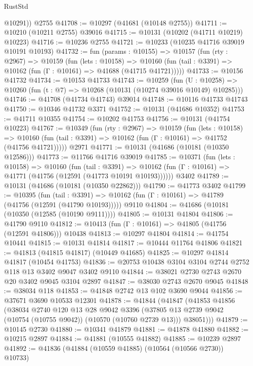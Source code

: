 \begin{lexlean}{RustStd}
\begin{coremodule}
        @10291))
    @2755
@41708 := @10297 (@41681 (@10148 @2755))
@41711 := @10210 (@10211 @2755) @39016
@41715 := @10131 (@10202 (@41711 @10219) @10223)
@41716 := @10236 @2755
@41721 := @10233 (@10235 @41716 @39019 @10191 @10193)
@41732 := fun (params : @10155) =>
  @10157
    (fun (rty : @2967) =>
    @10159
      (fun (lets : @10158) =>
      @10160 (fun (tail : @3391) => @10162 (fun (Γ : @10161) => @41688 (@41715 @41721)))))
@41733 := @10156 @41732
@41734 := @10153 @41733
@41743 := @10259
    (fun (U : @10258) => @10260 (fun (t : @7) => @10268 (@10131 (@10274 @39016 @10149) @10285)))
@41746 := @41708 (@41734 @41743) @39014
@41748 := @10116 @41733 @41743
@41750 := @10346 @41732 @3371
@41752 := @10131 (@41686 @10352)
@41753 := @41711 @10355
@41754 := @10202 @41753
@41756 := @10131 (@41754 @10223)
@41767 := @10349
    (fun (rty : @2967) =>
    @10159
      (fun (lets : @10158) =>
      @10160 (fun (tail : @3391) => @10162 (fun (Γ : @10161) => @41752 (@41756 @41721)))))
    @2971
@41771 := @10131 (@41686 (@10181 (@10350 @12586)))
@41773 := @11766 @41716 @39019
@41785 := @10371
    (fun (lets : @10158) =>
    @10160
      (fun (tail : @3391) =>
      @10162 (fun (Γ : @10161) => @41771 (@41756 (@12591 (@41773 @10191 @10193))))))
    @3402
@41789 := @10131 (@41686 (@10181 (@10350 @22862)))
@41790 := @41773 @3402
@41799 := @10395
    (fun (tail : @3391) => @10162 (fun (Γ : @10161) => @41789 (@41756 (@12591 (@41790 @10193)))))
    @9110
@41804 := @41686 (@10181 (@10350 (@12585 (@10190 @9111))))
@41805 := @10131 @41804
@41806 := @41790 @9110
@41812 := @10413 (fun (Γ : @10161) => @41805 (@41756 (@12591 @41806))) @10438
@41813 := @10297 @41804
@41814 := @41754 @10441
@41815 := @10131 @41814
@41817 := @10444 @11764 @41806
@41821 := @41813 (@41815 @41817) (@10449 @41685)
@41825 := @10297 @41814 @41817 (@10454 @41753)
@41836 := @20753 @10438 @3104 @3104 @2744 @2752 @118 @13 @3402 @9047 @3402 @9110
@41844 := @38021 @2730 @2743 @2670 @20 @3402 @9045 @3104 @2897
@41847 := @38030 @2743 @2670 @9045
@41848 := @38034 @118
@41853 := @41848 @2742 @13 @102 @3690 @9044
@41856 := @37671 @3690 @10533 @12301
@41878 := @41844
    (@41847
      (@41853
        @41856
        (@38034
          @2740
          @120
          @13
          @28
          @9042
          @3396
          (@37805 @13 @2739 @9042 (@10754 (@10755 @9042)) (@10570 (@10760 @2739 @13)))
          @38051)))
@41879 := @10145 @2730
@41880 := @10341 @41879
@41881 := @41878 @41880
@41882 := @10215 @2897
@41884 := @41881 (@10555 @41882)
@41885 := @10239 @2897
@41892 := @41836 (@41884 (@10559 @41885) (@10564 (@10566 @2730)) @10733)

\end{coremodule}
\end{lexlean}
